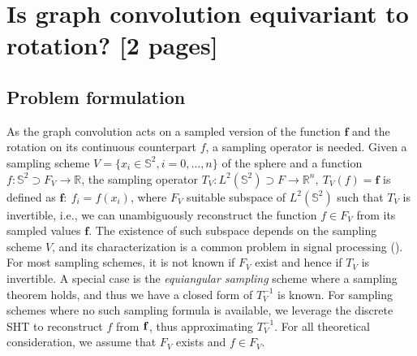 \documentclass{article} %
\renewcommand{\b}[1]{{\bm{#1}}}   %
\newcommand{\nati}[1]{{\color[rgb]{.3,.5,.9}{#1}}}
\begin{document}

\section{Is graph convolution equivariant to rotation? [2 pages]} \label{sec:equivariance}

\subsection{Problem formulation}
As the graph convolution acts on a sampled version of the function $\b{f}$ and the rotation on its continuous counterpart $f$, a sampling operator is needed.
Given a sampling scheme $V=\{x_i\in\mathbb S^2, i=0, \dots, n\}$ of the sphere and a function $f : \mathbb S^2 \supset F_V \to \mathbb R$, the sampling operator $T_V: L^2(\mathbb S^2) \supset F\to \mathbb R^n,\  T_V(f) = \b{f}$ is defined as $\b{f}:\ f_i=f(x_i)$, where $F_V$ suitable subspace of $L^2(\mathbb S^2)$ such that $T_V$ is invertible, i.e., we can unambiguously reconstruct the function $f\in F_V$ from its sampled values $\b{f}$.
The existence of such subspace depends on the sampling scheme $V$, and its characterization is a common problem in signal processing (\cite{driscoll1994Fouriersphere}).
For most sampling schemes, it is not known if $F_V$ exist and hence if $T_V$ is invertible. A special case is the \textit{equiangular sampling} scheme where a sampling theorem holds, and thus we have a closed form of $T_V^{-1}$ is known. %
For sampling schemes where no such sampling formula is available, we leverage the discrete SHT to reconstruct $f$ from $\bf{f}$, thus approximating $T_V^{-1}$.
For all theoretical consideration, we assume that $F_V$ exists and $f \in F_V$.
\end{document}
